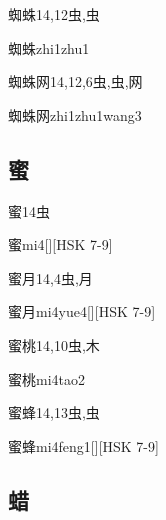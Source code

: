 \begin{Entry}{蜘蛛}{14,12}{⾍,⾍}
  \begin{Phonetics}{蜘蛛}{zhi1zhu1}
  \end{Phonetics}
\end{Entry}

\begin{Entry}{蜘蛛网}{14,12,6}{⾍,⾍,⽹}
  \begin{Phonetics}{蜘蛛网}{zhi1zhu1wang3}
  \end{Phonetics}
\end{Entry}

\subsection*{蜜}

\begin{Entry}{蜜}{14}{⾍}
  \begin{Phonetics}{蜜}{mi4}[][HSK 7-9]
  \end{Phonetics}
\end{Entry}

\begin{Entry}{蜜月}{14,4}{⾍,⽉}
  \begin{Phonetics}{蜜月}{mi4yue4}[][HSK 7-9]
  \end{Phonetics}
\end{Entry}

\begin{Entry}{蜜桃}{14,10}{⾍,⽊}
  \begin{Phonetics}{蜜桃}{mi4tao2}
  \end{Phonetics}
\end{Entry}

\begin{Entry}{蜜蜂}{14,13}{⾍,⾍}
  \begin{Phonetics}{蜜蜂}{mi4feng1}[][HSK 7-9]
  \end{Phonetics}
\end{Entry}

\subsection*{蜡}

